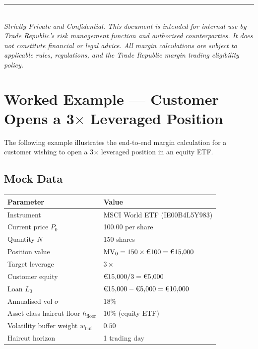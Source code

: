 \documentclass[9pt, a4paper]{extarticle}
\newcommand{\EUR}[1]{\ifmmode\text{\texteuro}#1\else\texteuro#1\fi}
\begin{document}
\renewcommand{\arraystretch}{1.0}

\vfill
\begin{center}
    \rule{0.5\linewidth}{0.4pt}\\[0.5em]
    {\small\itshape Strictly Private and Confidential.
    This document is intended for internal use by Trade Republic's risk management
    function and authorised counterparties. It does not constitute financial or
    legal advice. All margin calculations are subject to applicable rules,
    regulations, and the Trade Republic margin trading eligibility policy.}
\end{center}

\section{Worked Example — Customer Opens a 3$\times$ Leveraged Position}

The following example illustrates the end-to-end margin calculation for a customer
wishing to open a 3$\times$ leveraged position in an equity ETF.

\subsection*{Mock Data}

\begin{tabularx}{\linewidth}{lX}
\toprule
\textbf{Parameter} & \textbf{Value} \\
\midrule
Instrument          & MSCI World ETF (IE00B4L5Y983) \\
Current price $P_0$ & \EUR{100.00} per share \\
Quantity $N$        & 150 shares \\
Position value      & $\mathrm{MV}_0 = 150 \times \EUR{100} = \EUR{15{,}000}$ \\
Target leverage     & $3\times$ \\
Customer equity     & $\EUR{15{,}000} / 3 = \EUR{5{,}000}$ \\
Loan $L_0$          & $\EUR{15{,}000} - \EUR{5{,}000} = \EUR{10{,}000}$ \\
Annualised vol $\sigma$ & $18\%$ \\
Asset-class haircut floor $h_{\text{floor}}$ & $10\%$ (equity ETF) \\
Volatility buffer weight $w_{\text{buf}}$ & $0.50$ \\
Haircut horizon     & 1 trading day \\
\bottomrule
\end{tabularx}
\end{document}
